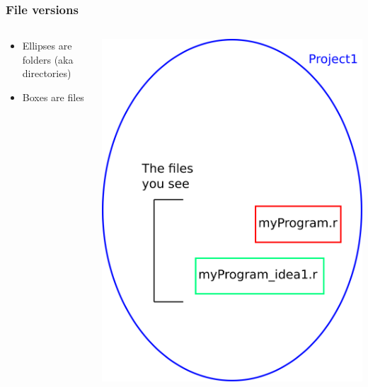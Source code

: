 \documentclass{beamer}
\begin{document}
\begin{frame}
  \frametitle{File versions}
  \begin{columns}[T]
    \begin{column}{.5\textwidth}
      \begin{itemize}
      \item Ellipses are folders (aka directories)
      \item Boxes are files
      \end{itemize}
    \end{column}
    \begin{column}{.5\textwidth}
      \includegraphics[width=\textwidth]{before_git.png}
    \end{column}
  \end{columns}
\end{frame}
\end{document}
